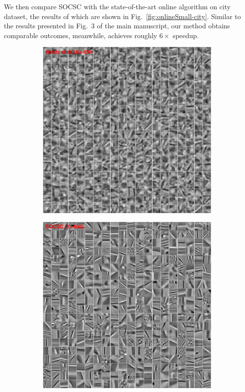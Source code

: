 \documentclass{egpubl}
\begin{document}
We then compare SOCSC with the state-of-the-art online algorithm on city dataset, the results of which are shown in Fig.\ \ref{fig:onlineSmall-city}. Similar to the results presented in Fig.~3 of the main manuscript, our method obtains comparable outcomes, meanwhile, achieves roughly $6 \times$ speedup.

\begin{figure}[h]
\centering
  \begin{subfigure}{0.5\textwidth}
  \includegraphics[width=1\linewidth]{figure/heide400-supple.pdf}
  \end{subfigure}
  \vspace{0.2cm}
  \begin{subfigure}{0.5\textwidth}
  \includegraphics[width=1\linewidth]{figure/online400-supple.pdf}
  \end{subfigure}
  \vspace{0.2cm}


\end{figure}
\end{document}
